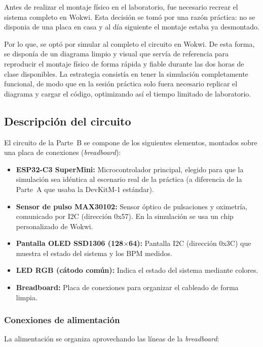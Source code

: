 \documentclass[11pt,a4paper]{article}
\begin{document}
Antes de realizar el montaje físico en el laboratorio, fue necesario recrear el sistema completo en Wokwi. Esta decisión se tomó por una razón práctica: no se disponia de una placa en casa y al día siguiente el montaje estaba ya desmontado.

Por lo que, se optó por simular al completo el circuito en Wokwi. De esta forma, se disponía de un diagrama limpio y visual que servía de referencia para reproducir el montaje físico de forma rápida y fiable durante las dos horas de clase disponibles. La estrategia consistía en tener la simulación completamente funcional, de modo que en la sesión práctica solo fuera necesario replicar el diagrama y cargar el código, optimizando así el tiempo limitado de laboratorio.

\subsection{Descripción del circuito}

El circuito de la Parte~B se compone de los siguientes elementos, montados sobre una placa de conexiones (\textit{breadboard}):

\begin{itemize}
    \item \textbf{ESP32-C3 SuperMini:} Microcontrolador principal, elegido para que la simulación sea idéntica al escenario real de la práctica (a diferencia de la Parte~A que usaba la DevKitM-1 estándar).
    \item \textbf{Sensor de pulso MAX30102:} Sensor óptico de pulsaciones y oximetría, comunicado por I2C (dirección 0x57). En la simulación se usa un chip personalizado de Wokwi.
    \item \textbf{Pantalla OLED SSD1306 (128$\times$64):} Pantalla I2C (dirección 0x3C) que muestra el estado del sistema y los BPM medidos.
    \item \textbf{LED RGB (cátodo común):} Indica el estado del sistema mediante colores.
    \item \textbf{Breadboard:} Placa de conexiones para organizar el cableado de forma limpia.
\end{itemize}

\subsubsection{Conexiones de alimentación}

La alimentación se organiza aprovechando las líneas de la \textit{breadboard}:
\end{document}
